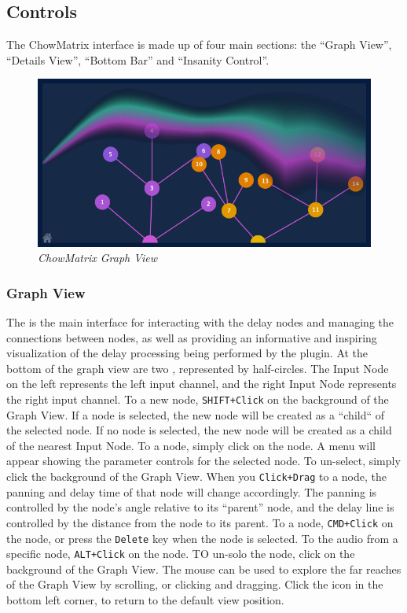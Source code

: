 \documentclass[landscape,twocolumn,a5paper]{manual}
\begin{document}
\subsection{Controls}
The ChowMatrix interface is made up of four main sections:
the ``Graph View'', ``Details View'', ``Bottom Bar''
and ``Insanity Control''.

\begin{figure}[ht]
    \center
    \includegraphics[width=0.75\columnwidth]{screenshots/GraphView.png}
    \caption{\label{fig:graph_view}{\it ChowMatrix Graph View}}
\end{figure}

\subsubsection{Graph View}
The  is the main interface for interacting
with the delay nodes and managing the connections between nodes,
as well as providing an informative and inspiring visualization
of the delay processing being performed by the plugin.
\newpar
At the bottom of the graph view are two ,
represented by half-circles. The Input Node on the left represents
the left input channel, and the right Input Node represents the right
input channel.
\newpar
To  a new node, \texttt{SHIFT+Click} on the
background of the Graph View. If a node is selected, the new
node will be created as a ``child`` of the selected node. If
no node is selected, the new node will be created as a child
of the nearest Input Node.
\newpar
To  a node, simply click on the node. A menu
will appear showing the parameter controls for the selected node.
To un-select, simply click the background of the Graph View.
\newpar
When you \texttt{Click+Drag} to  a node, the
panning and delay time of that node will change accordingly.
The panning is controlled by the node's angle relative to its
``parent'' node, and the delay line is controlled by the distance
from the node to its parent.
\newpar
To  a node, \texttt{CMD+Click} on the node,
or press the \texttt{Delete} key when the node is selected.
\newpar
To  the audio from a specific node,
\texttt{ALT+Click} on the node. TO un-solo the node,
click on the background of the Graph View.
\newpar
The mouse can be used to explore the far reaches of the
Graph View by scrolling, or clicking and dragging. Click
the  icon in the bottom left corner, to
return to the default view position.
\end{document}
